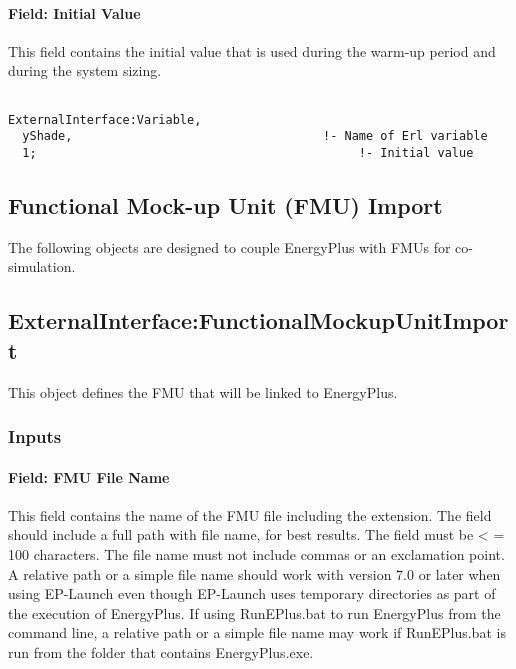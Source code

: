 \paragraph{Field: Initial Value}\label{field-initial-value-2}

This field contains the initial value that is used during the warm-up period and during the system sizing.

\begin{lstlisting}

ExternalInterface:Variable,
  yShade,                                   !- Name of Erl variable
  1;                                             !- Initial value
\end{lstlisting}

\subsection{Functional Mock-up Unit (FMU) Import}\label{functional-mock-up-unit-fmu-import}

The following objects are designed to couple EnergyPlus with FMUs for co-simulation.

\subsection{ExternalInterface:FunctionalMockupUnitImport}\label{externalinterfacefunctionalmockupunitimport}

This object defines the FMU that will be linked to EnergyPlus.

\subsubsection{Inputs}\label{inputs-4-012}

\paragraph{Field: FMU File Name}\label{field-fmu-file-name}

This field contains the name of the FMU file including the extension. The field should include a full path with file name, for best results. The field must be \textless{} = 100 characters. The file name must not include commas or an exclamation point. A relative path or a simple file name should work with version 7.0 or later when using EP-Launch even though EP-Launch uses temporary directories as part of the execution of EnergyPlus. If using RunEPlus.bat to run EnergyPlus from the command line, a relative path or a simple file name may work if RunEPlus.bat is run from the folder that contains EnergyPlus.exe.

